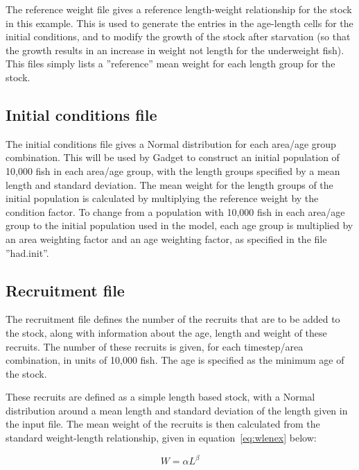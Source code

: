 \documentclass[10pt,titlepage]{article}
\begin{document}
The reference weight file gives a reference length-weight relationship for the stock in this example.  This is used to generate the entries in the age-length cells for the initial conditions, and to modify the growth of the stock after starvation (so that the growth results in an increase in weight not length for the underweight fish).  This files simply lists a ''reference'' mean weight for each length group for the stock.

{\small }

\subsection{Initial conditions file}

The initial conditions file gives a Normal distribution for each area/age group combination.  This will be used by Gadget to construct an initial population of 10,000 fish in each area/age group, with the length groups specified by a mean length and standard deviation.  The mean weight for the length groups of the initial population is calculated by multiplying the reference weight by the condition factor.  To change from a population with 10,000 fish in each area/age group to the initial population used in the model, each age group is multiplied by an area weighting factor and an age weighting factor, as specified in the file ''had.init''.

{\small }

\subsection{Recruitment file}

The recruitment file defines the number of the recruits that are to be added to the stock, along with information about the age, length and weight of these recruits.  The number of these recruits is given, for each timestep/area combination, in units of 10,000 fish.  The age is specified as the minimum age of the stock.

\bigskip
These recruits are defined as a simple length based stock, with a Normal distribution around a mean length and standard deviation of the length given in the input file.  The mean weight of the recruits is then calculated from the standard weight-length relationship, given in equation~\ref{eq:wlenex} below:

\begin{equation}\label{eq:wlenex}
W = \alpha L ^\beta
\end{equation}
\end{document}

